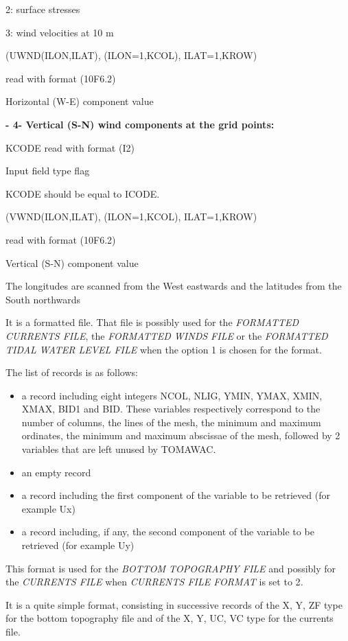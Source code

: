    2: surface stresses

   3: wind velocities at 10 m

 (UWND(ILON,ILAT), (ILON=1,KCOL), ILAT=1,KROW)

  read with format (10F6.2)

  Horizontal (W-E) component value

 \textbf{- 4- Vertical (S-N) wind components at the grid points:}

 KCODE read with format (I2)

  Input field type flag

  KCODE should be equal to ICODE.

 (VWND(ILON,ILAT), (ILON=1,KCOL), ILAT=1,KROW)

  read with format (10F6.2)

  Vertical (S-N) component value

 The longitudes are scanned from the West eastwards and the latitudes from the South northwards

 \underbar{ }\textbf{}



 It is a formatted file. That file is possibly used for the \textit{FORMATTED CURRENTS FILE}, the \textit{FORMATTED WINDS FILE} or the \textit{FORMATTED TIDAL WATER LEVEL FILE} when the option 1 is chosen for the format.

 The list of records is as follows:

\begin{itemize}
\item  a record including eight integers NCOL, NLIG, YMIN, YMAX, XMIN, XMAX, BID1 and BID. These variables respectively correspond to the number of columns, the lines of the mesh, the minimum and maximum ordinates, the minimum and maximum abscissae of the mesh, followed by 2 variables that are left unused by TOMAWAC.

\item  an empty record

\item  a record including the first component of the variable to be retrieved (for example Ux)

\item  a record including, if any, the second component of the variable to be retrieved (for example Uy)
\end{itemize}

\underbar{}

\textbf{}



 This format is used for the \textit{BOTTOM TOPOGRAPHY FILE }and possibly for the \textit{CURRENTS FILE }when \textit{CURRENTS FILE FORMAT} is set to 2\textit{.}

 It is a quite simple format, consisting in successive records of the X, Y, ZF type for the bottom topography file and of the X, Y, UC, VC type for the currents file.



